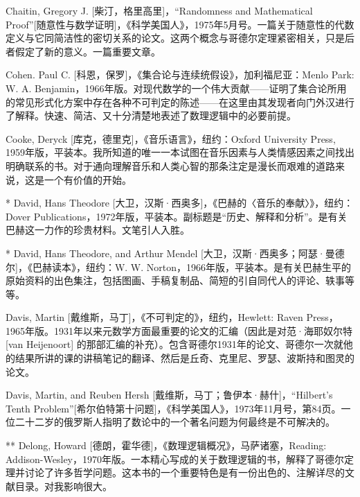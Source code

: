 \begin{thebib}
\begin{biblist}
\item Chaitin, Gregory J. [柴汀，格里高里]，“Randomness and Mathematical Proof”[随意性与数学证明]，《科学美国人》，1975年5月号。一篇关于随意性的代数定义与它同简洁性的密切关系的论文。这两个概念与哥德尔定理紧密相关，只是后者假定了新的意义。一篇重要文章。

\item Cohen. Paul C. [科恩，保罗]，《集合论与连续统假设》，加利福尼亚：Menlo Park: W. A. Benjamin，1966年版。对现代数学的一个伟大贡献——证明了集合论所用的常见形式化方案中存在各种不可判定的陈述——在这里由其发现者向门外汉进行了解释。快速、简洁、又十分清楚地表述了数理逻辑中的必要前提。

\item Cooke, Deryck [库克，德里克]，《音乐语言》，纽约：Oxford University Press, 1959年版，平装本。我所知道的唯一一本试图在音乐因素与人类情感因素之间找出明确联系的书。对于通向理解音乐和人类心智的那条注定是漫长而艰难的道路来说，这是一个有价值的开始。

\item[*] David, Hans Theodore [大卫，汉斯·西奥多]，《巴赫的〈音乐的奉献〉》，纽约：Dover Publications，1972年版，平装本。副标题是“历史、解释和分析”。是有关巴赫这一力作的珍贵材料。文笔引人入胜。

\item[*] David, Hans Theodore, and Arthur Mendel [大卫，汉斯·西奥多；阿瑟·曼德尔]，《巴赫读本》，纽约：W. W. Norton，1966年版，平装本。是有关巴赫生平的原始资料的出色集注，包括图画、手稿复制品、简短的引自同代人的评论、轶事等等。

\item Davis, Martin [戴维斯，马丁]，《不可判定的》，纽约，Hewlett: Raven Press，1965年版。1931年以来元数学方面最重要的论文的汇编（因此是对范·海耶奴尔特 [van Heijenoort] 的那部汇编的补充）。包含哥德尔1931年的论文、哥德尔一次就他的结果所讲的课的讲稿笔记的翻译、然后是丘奇、克里尼、罗瑟、波斯持和图灵的论文。

\item Davis, Martin, and Reuben Hersh [戴维斯，马丁；鲁伊本·赫什]，“Hilbert's Tenth Problem”[希尔伯特第十问题]，《科学美国人》，1973年11月号，第84页。一位二十二岁的俄罗斯人指明了数论中的一个著名问题为何最终是不可解决的。

\item[**] Delong, Howard [德朗，霍华德]，《数理逻辑概况》，马萨诸塞，Reading: Addison-Wesley，1970年版。一本精心写成的关于数理逻辑的书，解释了哥德尔定理并讨论了许多哲学问题。这本书的一个重要特色是有一份出色的、注解详尽的文献目录。对我影响很大。


\end{biblist}
\end{thebib}
